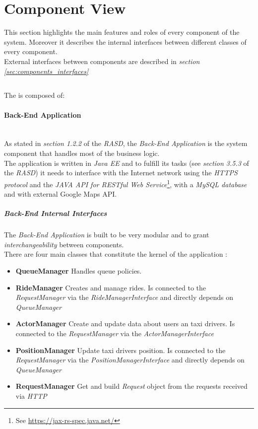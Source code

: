 \section{Component View} %
\label{sec:component_view}
This section highlights the main features and roles of every component of the system. Moreover it describes the internal interfaces between different classes of every component.\\
External interfaces between components are described in \emph{section \ref{sec:components_interfaces}}
\subsection{} %
\label{sub:nameref_}
The  is composed of:

\paragraph{Back-End Application} %
\label{par:back_end_application}\hfill \\
As stated in \emph{section 1.2.2} of the \emph{RASD}, the \emph{Back-End Application} is the system component that handles most of the business logic.\\
The application is written in \emph{Java EE} and to fulfill its tasks (see \emph{section 3.5.3} of the \emph{RASD}) it needs to interface with the Internet network using the \emph{HTTPS protocol} and the \emph{JAVA API for RESTful Web Service}\footnote{See \url{https://jax-rs-spec.java.net/}}, with a \emph{MySQL database} and with external Google Maps API.\\

\subparagraph{Back-End Internal Interfaces}
\label{subpar:back_end_interfaces}
The \emph{Back-End Application} is built to be very modular and to grant \emph{interchangeability} between components.\\
There are four main classes that constitute the kernel of the application :
\begin{itemize}
	\item \textbf{QueueManager} Handles queue policies. 
	\item \textbf{RideManager}  Creates and manage rides. Is connected to the \emph{RequestManager} via the \emph{RideManagerInterface} and directly depends on \emph{QueueManager}
	\item \textbf{ActorManager} Create and update data about users an taxi drivers. Is connected to the \emph{RequestManager} via the \emph{ActorManagerInterface}
	\item \textbf{PositionManager} Update taxi drivers position. Is connected to the \emph{RequestManager} via the \emph{PositionManagerInterface} and directly depends on \emph{QueueManager}
	\item \textbf{RequestManager}	Get and build \emph{Request} object from the requests received via \emph{HTTP}
\end{itemize}

